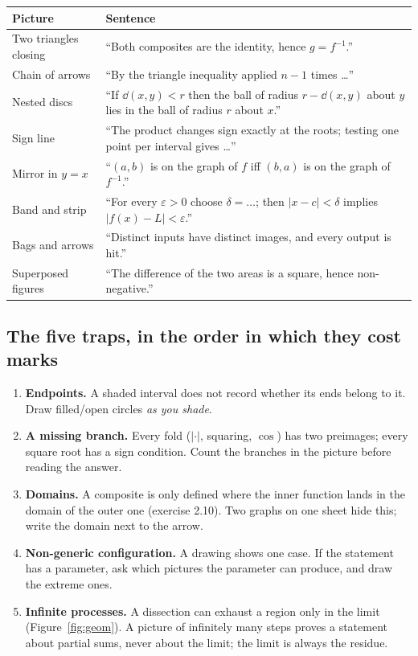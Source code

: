 \begin{center}
\small
\begin{tabular}{@{}p{4.6cm}p{9.8cm}@{}}
\toprule
Picture & Sentence \\
\midrule
Two triangles closing & ``Both composites are the identity, hence $g=f^{-1}$.'' \\
Chain of arrows & ``By the triangle inequality applied $n-1$ times \dots'' \\
Nested discs & ``If $\dd(x,y)<r$ then the ball of radius $r-\dd(x,y)$ about $y$ lies in
  the ball of radius $r$ about $x$.'' \\
Sign line & ``The product changes sign exactly at the roots; testing one point per
  interval gives \dots'' \\
Mirror in $y=x$ & ``$(a,b)$ is on the graph of $f$ iff $(b,a)$ is on the graph of
  $f^{-1}$.'' \\
Band and strip & ``For every $\varepsilon>0$ choose $\delta=\dots$; then
  $|x-c|<\delta$ implies $|f(x)-L|<\varepsilon$.'' \\
Bags and arrows & ``Distinct inputs have distinct images, and every output is hit.'' \\
Superposed figures & ``The difference of the two areas is a square, hence non-negative.''\\
\bottomrule
\end{tabular}
\end{center}

\subsection{The five traps, in the order in which they cost marks}

\begin{enumerate}[leftmargin=1.6em,itemsep=2pt]
\item \textbf{Endpoints.} A shaded interval does not record whether its ends belong to
  it. Draw filled/open circles \emph{as you shade}.
\item \textbf{A missing branch.} Every fold ($|\cdot|$, squaring, $\cos$) has two
  preimages; every square root has a sign condition. Count the branches in the picture
  before reading the answer.
\item \textbf{Domains.} A composite is only defined where the inner function lands in the
  domain of the outer one (exercise 2.10). Two graphs on one sheet hide this; write the
  domain next to the arrow.
\item \textbf{Non-generic configuration.} A drawing shows one case. If the statement has
  a parameter, ask which pictures the parameter can produce, and draw the extreme ones.
\item \textbf{Infinite processes.} A dissection can exhaust a region only in the limit
  (Figure~\ref{fig:geom}). A picture of infinitely many steps proves a statement about
  partial sums, never about the limit; the limit is always the residue.
\end{enumerate}

